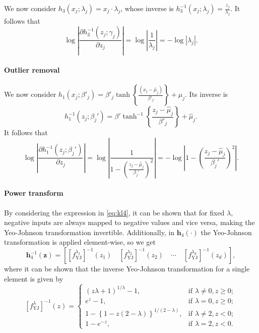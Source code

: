 \documentclass{statsmsc}
\begin{document}
We now consider $h_3(x_j;\lambda_j)=x_j\cdot \lambda_j$, whose inverse is $h_3^{-1}(x_j;\lambda_j)=\frac{z_j}{\lambda_j}$. It follows that
\begin{equation}
    \log \left|\frac{\partial h_3^{-1}(z_j ; \gamma_j)}{\partial z_j} \right|
    = \log \left|\frac{1}{\lambda_j}  \right|
    =- \log |\lambda_j|.
\end{equation}

\paragraph{Outlier removal}%
\label{par:Outlier removal}

We now consider $h_1(x_j;\beta'_j)= \beta'_j \tanh\left\{\frac{(x_j - \hat{\mu}_j)}{\beta'_j}  \right\} + \hat{\mu}_j$. Its inverse is
\begin{equation}
    h_1^{-1}(z_j;\beta_j') =\beta' \tanh^{-1} \left\{\frac{z_j - \hat{\mu}_j}{\beta'_j}  \right\}
    +\hat{\mu}_j.
\end{equation}
It follows that
\begin{equation}
    \log \left|\frac{\partial h_1^{-1}(z_j ; \beta_j')}{\partial z_j} \right|
    = \log \left| \frac{1}{1-\left( \frac{z_j-\hat{\mu}_j}{\beta_j'}  \right)^2}  \right|
    = -\log\left| 1-\left( \frac{z_j-\hat{\mu}_j}{\beta_j'}  \right)^2 \right|.
\end{equation}

\paragraph{Power transform}%
\label{par:Power transform}

By considering the expression in \cref{eq:kl4}, it can be shown that for fixed $\lambda$, negative inputs are always
mapped to negative values and vice versa, making the Yeo-Johnson transformation invertible.
Additionally, in $\mathbf{h}_4(\cdot)$ the Yeo-Johnson transformation is applied element-wise, so
we get 
\begin{equation}
    \mathbf{h}_4^{-1}(\mathbf{z})=\left[\left[f_{\textrm{YJ}}^{\lambda_1}\right]^{-1}(z_1) \quad \left[f_{\textrm{YJ}}^{\lambda_2}\right]^{-1}(z_2) \quad \cdots \quad \left[f_{\textrm{YJ}}^{\lambda_d}\right]^{-1}(z_d) \right],
\end{equation}
where it can be shown that the inverse Yeo-Johnson transformation for a single element is given by
\begin{equation}
    \left[f_{\textrm{YJ}}^\lambda\right]^{-1}(z)= \left\{
    \begin{array}{ll}
        (z \lambda + 1)^{1/\lambda} -1, & \textrm{if } \lambda \neq 0, z \geq 0; \\
        e^z-1, & \textrm{if } \lambda = 0, z \geq 0;  \\
        1-\left\{1-z(2-\lambda)\right\}^{1/ (2-\lambda)} , & \textrm{if } \lambda \neq 2, z < 0; \\
        1-e^{-z}, & \textrm{if } \lambda=2, z < 0.
    \end{array}
    \right.
\end{equation}
\end{document}
